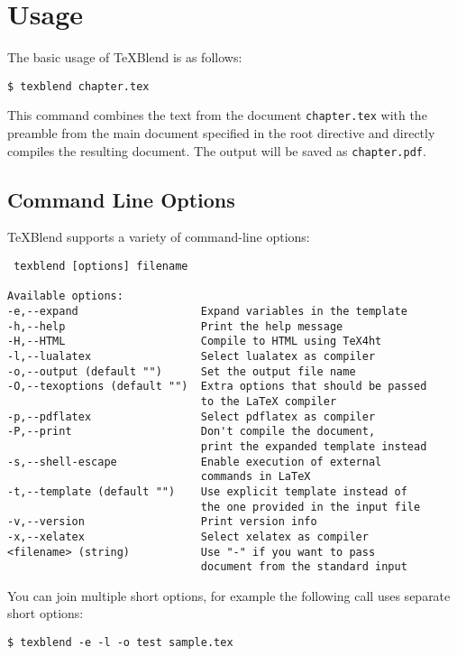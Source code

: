 \section{Usage}

The basic usage of \TeX Blend is as follows:

\begin{verbatim}
$ texblend chapter.tex
\end{verbatim}

This command combines the text from the document \texttt{chapter.tex} with the preamble
from the main document specified in the root directive and directly compiles
the resulting document. The output will be saved as \texttt{chapter.pdf}.

\subsection{Command Line Options}

TeXBlend supports a variety of command-line options:

\begin{verbatim}
 texblend [options] filename

Available options:
-e,--expand                   Expand variables in the template
-h,--help                     Print the help message
-H,--HTML                     Compile to HTML using TeX4ht
-l,--lualatex                 Select lualatex as compiler 
-o,--output (default "")      Set the output file name
-O,--texoptions (default "")  Extra options that should be passed 
                              to the LaTeX compiler
-p,--pdflatex                 Select pdflatex as compiler 
-P,--print                    Don't compile the document, 
                              print the expanded template instead
-s,--shell-escape             Enable execution of external 
                              commands in LaTeX
-t,--template (default "")    Use explicit template instead of 
                              the one provided in the input file
-v,--version                  Print version info
-x,--xelatex                  Select xelatex as compiler 
<filename> (string)           Use "-" if you want to pass 
                              document from the standard input
\end{verbatim}

You can join multiple short options, for example the following call uses separate short options:

\begin{verbatim}
$ texblend -e -l -o test sample.tex
\end{verbatim}

